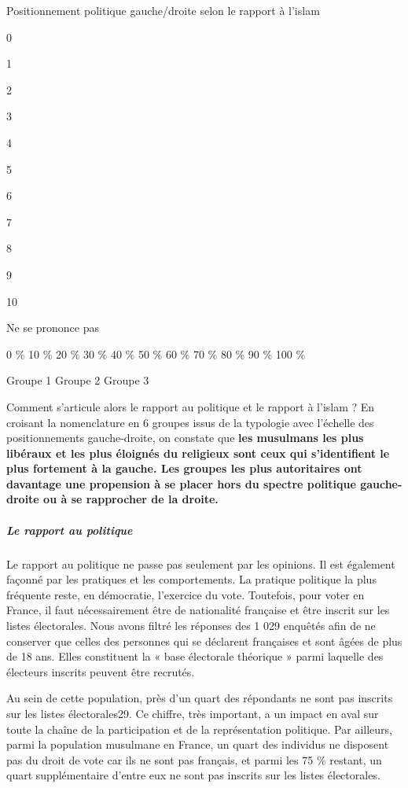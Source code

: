 Positionnement politique gauche/droite selon le rapport à l'islam

0

1

2

3

4

5

6

7

8

9

10

Ne se prononce pas


0 \% 10 \% 20 \% 30 \% 40 \% 50 \% 60 \% 70 \% 80 \% 90 \% 100 \%

Groupe 1 Groupe 2 Groupe 3

Comment s'articule alors le rapport au politique et le rapport à l'islam
? En croisant la nomenclature en 6 groupes issus de la typologie avec
l'échelle des positionnements gauche-droite, on constate que \textbf{les
musulmans les plus libéraux et les plus éloignés du religieux sont ceux
qui s'identifient le plus fortement à la gauche. Les groupes les plus
autoritaires ont davantage une propension à se placer hors du spectre
politique gauche-droite ou à se rapprocher de la droite.}


\hypertarget{le-rapport-au-politique}{%
\subparagraph{Le rapport au politique}\label{le-rapport-au-politique}}


Le rapport au politique ne passe pas seulement par les opinions. Il est
également façonné par les pratiques et les comportements. La pratique
politique la plus fréquente reste, en démocratie, l'exercice du vote.
Toutefois, pour voter en France, il faut nécessairement être de
nationalité française et être inscrit sur les listes électorales. Nous
avons filtré les réponses des 1 029 enquêtés afin de ne conserver que
celles des personnes qui se déclarent françaises et sont âgées de plus
de 18 ans. Elles constituent la « base électorale théorique » parmi
laquelle des électeurs inscrits peuvent être recrutés.



Au sein de cette population, près d'un quart des répondants ne sont pas
inscrits sur les listes électorales29. Ce chiffre, très important, a un
impact en aval sur toute la chaîne de la participation et de la
représentation politique. Par ailleurs, parmi la population musulmane en
France, un quart des individus ne disposent pas du droit de vote car ils
ne sont pas français, et parmi les 75 \% restant, un quart
supplémentaire d'entre eux ne sont pas inscrits sur les listes
électorales.

